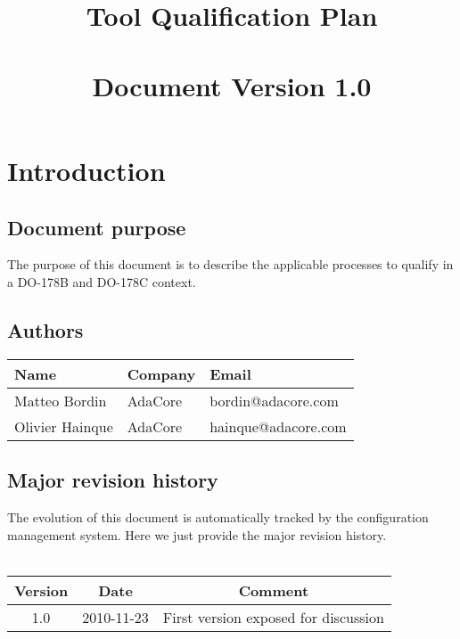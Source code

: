 \documentclass {report}
\begin{document}
\title{\huge
  \xcov{}\\
  Tool Qualification Plan\\ \ \\
  \large \textbf{Document Version 1.0}}

\maketitle
\tableofcontents

\chapter{Introduction}

\section{Document purpose}
The purpose of this document is to describe the applicable processes to
qualify \xcov{} in a DO-178B and DO-178C context.

\section{Authors}
\begin{tabular}{|l|l|l|}
\hline
\textbf{Name} & \textbf{Company} & \textbf{Email} \\ \hline
Matteo Bordin & AdaCore & bordin@adacore.com \\ \hline
Olivier Hainque & AdaCore & hainque@adacore.com \\ \hline
\end{tabular}

\section{Major revision history}

The evolution of this document is automatically tracked by the configuration
management system. Here we just provide the major revision history.  \ \\ \\
\begin{tabular}{|c|c|c|}
\hline
\textbf{Version} & \textbf{Date} & \textbf{Comment} \\ \hline
1.0 & 2010-11-23 & First version exposed for discussion \\ \hline
\end{tabular}


\end{document}
